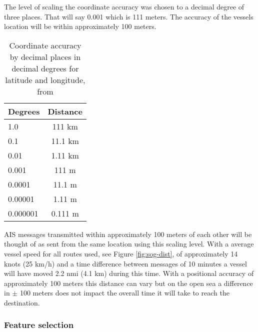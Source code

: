 \documentclass[../main.tex]{subfiles}
\begin{document}
The level of scaling the coordinate accuracy was chosen to a decimal degree of three places. That will say 0.001 which is 111 meters. The accuracy of the vessels location will be within approximately 100 meters.

\begin{table}[H]
\centering
\begin{tabular}{|l|c|}
\hline
\rowcolor[HTML]{C0C0C0} 
\textbf{Degrees} & \multicolumn{1}{l|}{\cellcolor[HTML]{C0C0C0}\textbf{Distance}} \\ \hline
1.0              & 111 km                                                         \\ \hline
0.1              & 11.1 km                                                        \\ \hline
0.01             & 1.11 km                                                        \\ \hline
0.001            & 111 m                                                          \\ \hline
0.0001           & 11.1 m                                                         \\ \hline
0.00001          & 1.11 m                                                         \\ \hline
0.000001          & 0.111 m                                                         \\ \hline
\end{tabular}
\caption{Coordinate accuracy by decimal places in decimal degrees for latitude and longitude, from \cite{GIS_2011}}
\label{tab:gis-accuracy}
\end{table}

AIS messages transmitted within approximately 100 meters of each other will be thought of as sent from the same location using this scaling level. With a average vessel speed for all routes used, see Figure \ref{fig:sog-dist}, of approximately 14 knots (25 km/h) and a time difference between messages of 10 minutes a vessel will have moved 2.2 nmi (4.1 km) during this time. With a positional accuracy of approximately 100 meters this distance can vary but on the open sea a difference in $\pm$ 100 meters does not impact the overall time it will take to reach the destination.


\subsubsection{Feature selection}
\end{document}
